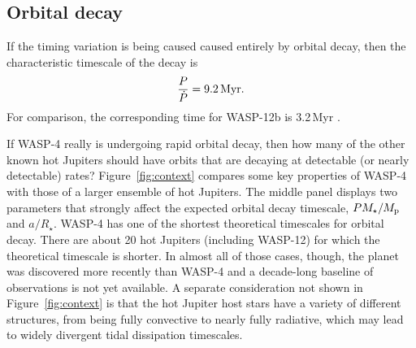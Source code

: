 \documentclass[12pt,twocolumn,tighten]{aastex62}
\begin{document}
\subsection{Orbital decay}

If the timing variation is being caused caused entirely by orbital
decay, then the characteristic timescale of the decay is
\begin{equation}
  \frac{P}{ \dot{P} } = 9.2 \, {\rm Myr}.
\end{equation}
For comparison, the corresponding time for WASP-12b is 3.2\,Myr
\citep{patra_2017}.

If WASP-4 really is undergoing rapid orbital decay, then how many of
the other known hot Jupiters should have orbits that are decaying at
detectable (or nearly detectable) rates?  Figure~\ref{fig:context}
compares some key properties of WASP-4 with those of a larger ensemble
of hot Jupiters.  The middle panel displays two parameters that
strongly affect the expected orbital decay timescale, $P
M_\star/M_{\rm p}$ and $a/R_\star$.  WASP-4 has one of the shortest
theoretical timescales for orbital decay.  There are about 20 hot
Jupiters (including WASP-12) for which the theoretical timescale is
shorter.  In almost all of those cases, though, the planet was
discovered more recently than WASP-4 and a decade-long baseline of
observations is not yet available.  A separate consideration not shown
in Figure~\ref{fig:context} is that the hot Jupiter host stars have a
variety of different structures, from being fully convective to nearly
fully radiative, which may lead to widely divergent tidal dissipation
timescales.
\end{document}
